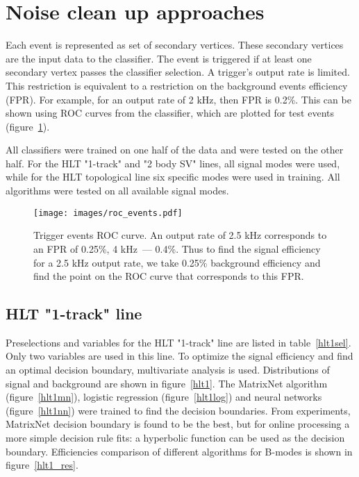 \documentclass{llncs}
\begin{document}
\section{Noise clean up approaches}
Each event is represented as set of secondary vertices. These secondary vertices are the input data to the classifier.  The event is triggered if at least one secondary vertex passes the classifier selection. A trigger's output rate is limited. This restriction is equivalent to a restriction on the background events efficiency (FPR). For example, for an output rate of 2 kHz, then FPR is 0.2\%. This can be shown using ROC curves from the classifier, which are plotted for test events (figure~\ref{roc}).

All classifiers were trained on one half of the data and were tested on the other half. For the HLT "1-track" and "2 body SV" lines, all signal modes were used, while for the HLT topological line six specific modes were used in training.  All algorithms were tested on all available signal modes.

\begin{figure}[h]
\texttt{[image: images/roc\_events.pdf]}\hspace{2pc}%
\begin{minipage}[b]{14pc}\caption{\label{roc} Trigger events ROC curve. An output rate of 2.5 kHz corresponds to an FPR of 0.25\%, 4 kHz~--- 0.4\%. Thus to find the signal efficiency for a 2.5 kHz output rate, we take 0.25\% background efficiency and find the point on the ROC curve that corresponds to this FPR.}
\end{minipage}
\end{figure}

\subsection{HLT "1-track" line}
Preselections and variables for the HLT "1-track" line are listed in table~\ref{hlt1sel}. Only two variables are used in this line. To optimize the signal efficiency and find an optimal decision boundary,  multivariate analysis is used. Distributions of signal and background are shown in figure~\ref{hlt1}. The MatrixNet\cite{mn_paper} algorithm (figure~\ref{hlt1mn}), logistic regression (figure~\ref{hlt1log}) and neural networks (figure~\ref{hlt1nn}) were trained to find the decision boundaries. From experiments, MatrixNet decision boundary is found to be the best, but for online processing a more simple decision rule fits: a hyperbolic function can be used as the decision boundary. Efficiencies comparison of different algorithms for B-modes is shown in figure~\ref{hlt1_res}.
\end{document}
